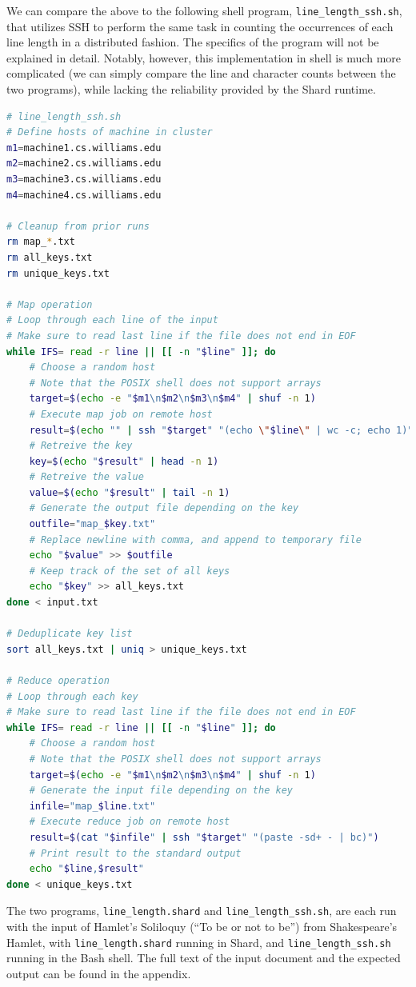 \documentclass[twoside]{report}
\begin{document}
We can compare the above to the following shell program, \texttt{line\_length\_ssh.sh}, that utilizes SSH to perform the same task in counting the occurrences of each line length in a distributed fashion.
The specifics of the program will not be explained in detail.
Notably, however, this implementation in shell is much more complicated (we can simply compare the line and character counts between the two programs), while lacking the reliability provided by the Shard runtime.
\begin{lstlisting}[language=sh]
# line_length_ssh.sh
# Define hosts of machine in cluster
m1=machine1.cs.williams.edu
m2=machine2.cs.williams.edu
m3=machine3.cs.williams.edu
m4=machine4.cs.williams.edu

# Cleanup from prior runs
rm map_*.txt
rm all_keys.txt
rm unique_keys.txt

# Map operation
# Loop through each line of the input
# Make sure to read last line if the file does not end in EOF
while IFS= read -r line || [[ -n "$line" ]]; do
    # Choose a random host
    # Note that the POSIX shell does not support arrays
    target=$(echo -e "$m1\n$m2\n$m3\n$m4" | shuf -n 1)
    # Execute map job on remote host
    result=$(echo "" | ssh "$target" "(echo \"$line\" | wc -c; echo 1)")
    # Retreive the key
    key=$(echo "$result" | head -n 1)
    # Retreive the value
    value=$(echo "$result" | tail -n 1)
    # Generate the output file depending on the key
    outfile="map_$key.txt"
    # Replace newline with comma, and append to temporary file
    echo "$value" >> $outfile
    # Keep track of the set of all keys
    echo "$key" >> all_keys.txt
done < input.txt

# Deduplicate key list
sort all_keys.txt | uniq > unique_keys.txt

# Reduce operation
# Loop through each key
# Make sure to read last line if the file does not end in EOF
while IFS= read -r line || [[ -n "$line" ]]; do
    # Choose a random host
    # Note that the POSIX shell does not support arrays
    target=$(echo -e "$m1\n$m2\n$m3\n$m4" | shuf -n 1)
    # Generate the input file depending on the key
    infile="map_$line.txt"
    # Execute reduce job on remote host
    result=$(cat "$infile" | ssh "$target" "(paste -sd+ - | bc)")
    # Print result to the standard output
    echo "$line,$result"
done < unique_keys.txt
\end{lstlisting}

The two programs, \texttt{line\_length.shard} and \texttt{line\_length\_ssh.sh}, are each run with the input of Hamlet's Soliloquy (``To be or not to be'') from Shakespeare's Hamlet, with \texttt{line\_length.shard} running in Shard, and \texttt{line\_length\_ssh.sh} running in the Bash shell.
The full text of the input document and the expected output can be found in the appendix.
\end{document}
